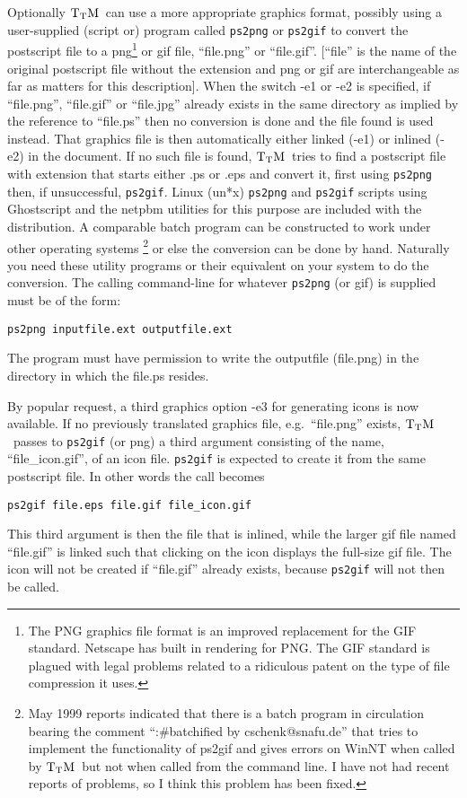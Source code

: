 \documentclass[12pt]{article}
\def\TtM{$\rm{}T_TH$}
\def\TtM{$\rm{}T_TM$}%
\begin{document}
 Optionally \TtM\ can use a more appropriate
graphics format, possibly using a user-supplied (script or) program
called \verb|ps2png| or \verb|ps2gif| to convert the postscript file
to a png\footnote{The PNG graphics file format is an improved
replacement for the GIF standard. Netscape has built in rendering for
PNG. The GIF standard is plagued with legal problems related to a
ridiculous patent on the type of file compression it uses.}  or gif
file, ``file.png'' or ``file.gif''. [``file'' is the name of the
original postscript file without the extension and png or gif are
interchangeable as far as matters for this
description]. When the switch -e1 or -e2 is specified, if
``file.png'', ``file.gif'' or ``file.jpg'' already exists in the same
directory as implied by the reference to ``file.ps'' then no
conversion is done and the file found is used instead.  That graphics
file is then automatically either linked (-e1) or inlined (-e2) in the
document. If no such file is found, \TtM\ tries to find a postscript
file with extension that starts either .ps or .eps and convert it,
first using \verb|ps2png| then, if unsuccessful, \verb|ps2gif|.  Linux
(un*x) \verb|ps2png| and \verb|ps2gif| scripts using Ghostscript and
the netpbm utilities for this purpose are included with the
distribution.  A comparable batch program can be constructed to work
under other operating systems
\footnote{\label{ps2gifprob}May 1999 reports indicated that there is a
batch program in circulation bearing the comment ``:\#batchified by
cschenk@snafu.de'' that tries to implement the functionality of ps2gif
and gives errors on WinNT when called by \TtM\ but not when called from
the command line. I have not had recent reports of problems, so I
think this problem has been fixed.}  or else the conversion can be done by
hand. Naturally you need these utility programs or their equivalent on
your system to do the conversion.  The calling command-line for
whatever \verb|ps2png| (or gif) is supplied must be of the form:
\begin{verbatim}ps2png inputfile.ext outputfile.ext\end{verbatim}
 The program must
have permission to write the outputfile (file.png) in the directory in
which the file.ps resides. 


By popular request, a third graphics option -e3 for generating icons is
now available. If no previously translated graphics file,
e.g.~``file.png''  exists, \TtM\ passes to \verb|ps2gif| (or png) a third
argument consisting of the name, ``file\_icon.gif'', of an icon file.
\verb|ps2gif| is expected to create it from the same postscript file. In
other words the call becomes
\begin{verbatim}ps2gif file.eps file.gif file_icon.gif\end{verbatim}
 This third argument is then the file that is
inlined, while the larger gif file named ``file.gif'' is linked such
that clicking on the icon displays the full-size gif file. The icon
will not be created if ``file.gif'' already exists, because
\verb|ps2gif| will not then be called.
\end{document}
